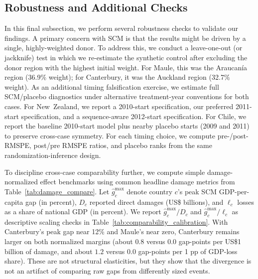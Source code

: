 \documentclass[12pt]{article}
\begin{document}
\subsection{Robustness and Additional Checks}
\label{sec:robustness_checks}
In this final subsection, we perform several robustness checks to validate our findings. A primary concern with SCM is that the results might be driven by a single, highly-weighted donor. To address this, we conduct a leave-one-out (or jackknife) test in which we re-estimate the synthetic control after excluding the donor region with the highest initial weight. For Maule, this was the Araucanía region (36.9\% weight); for Canterbury, it was the Auckland region (32.7\% weight). As an additional timing falsification exercise, we estimate full SCM/placebo diagnostics under alternative treatment-year conventions for both cases. For New~Zealand, we report a 2010-start specification, our preferred 2011-start specification, and a sequence-aware 2012-start specification. For Chile, we report the baseline 2010-start model plus nearby placebo starts (2009 and 2011) to preserve cross-case symmetry. For each timing choice, we compute pre-/post-RMSPE, post/pre RMSPE ratios, and placebo ranks from the same randomization-inference design.

To discipline cross-case comparability further, we compute simple damage-normalized effect benchmarks using common headline damage metrics from Table~\ref{tab:damage_compare}. Let $\widehat{g}^{\max}_c$ denote country $c$'s peak SCM GDP-per-capita gap (in percent), $D_c$ reported direct damages (US\$ billions), and $\ell_c$ losses as a share of national GDP (in percent). We report $\widehat{g}^{\max}_c / D_c$ and $\widehat{g}^{\max}_c / \ell_c$ as descriptive scaling checks in Table~\ref{tab:comparability_calibration}. With Canterbury's peak gap near 12\% and Maule's near zero, Canterbury remains larger on both normalized margins (about $0.8$ versus $0.0$ gap-points per US\$1 billion of damage, and about $1.2$ versus $0.0$ gap-points per 1 pp of GDP-loss share). These are not structural elasticities, but they show that the divergence is not an artifact of comparing raw gaps from differently sized events.
\end{document}
